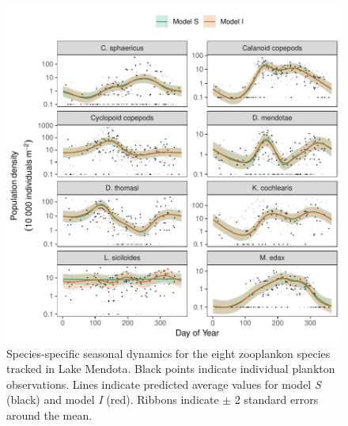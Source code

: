 \documentclass[12pt]{article}
\begin{document}
\begin{figure}
\centering
\includegraphics{../figures/zoo_comm_plot-1.pdf}
\caption{\label{fig:zoo_comp}Species-specific seasonal dynamics for the
eight zooplankon species tracked in Lake Mendota. Black points indicate
individual plankton observations. Lines indicate predicted average
values for model \emph{S} (black) and model \emph{I} (red). Ribbons
indicate \(\pm\) 2 standard errors around the mean.}
\end{figure}
\end{document}
